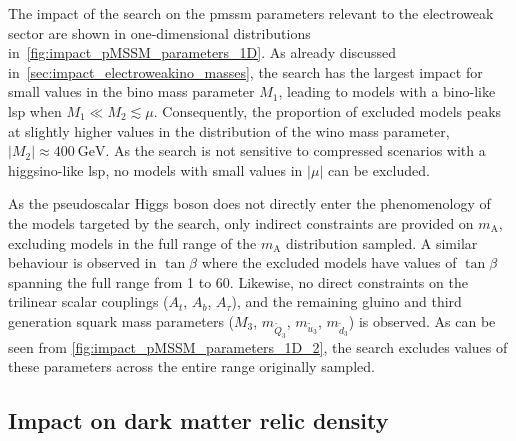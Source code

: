 The impact of the \onelepton search on the \gls{pmssm} parameters relevant to the electroweak sector are shown in one-dimensional distributions in~\cref{fig:impact_pMSSM_parameters_1D}. As already discussed in~\cref{sec:impact_electroweakino_masses}, the \onelepton search has the largest impact for small values in the bino mass parameter $M_1$, leading to models with a bino-like \gls{lsp} when $M_1 \ll M_2 \lesssim \mu$. Consequently, the proportion of excluded models peaks at slightly higher values in the distribution of the wino mass parameter, $\vert M_2\vert\approx\SI{400}{\GeV}$. As the search is not sensitive to compressed scenarios with a higgsino-like \gls{lsp}, no models with small values in $\vert\mu\vert$ can be excluded. 

As the pseudoscalar Higgs boson does not directly enter the phenomenology of the models targeted by the \onelepton search, only indirect constraints are provided on $m_\mathrm{A}$, excluding models in the full range of the $m_\mathrm{A}$ distribution sampled. A similar behaviour is observed in $\tan\beta$ where the excluded models have values of $\tan\beta$ spanning the full range from 1 to 60. Likewise, no direct constraints on the trilinear scalar couplings ($A_t$, $A_b$, $A_\tau$), and the remaining gluino and third generation squark mass parameters ($M_3$, $m_{\tilde{Q}_3}$, $m_{\tilde{u}_3}$, $m_{\tilde{d}_3}$) is observed. As can be seen from \cref{fig:impact_pMSSM_parameters_1D_2}, the \onelepton search excludes values of these parameters across the entire range originally sampled. 



\subsection{Impact on dark matter relic density}

